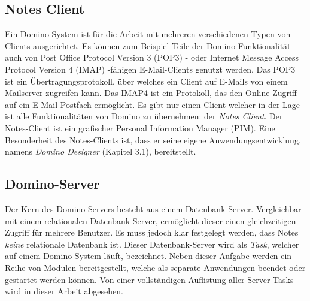 
\subsection{Notes Client}
\label{sec:2allgemein}


Ein Domino-System ist für die Arbeit mit mehreren verschiedenen Typen von Clients ausgerichtet. Es k\"onnen zum Beispiel Teile der Domino Funktionalit\"at 
auch von Post Office \linebreak Protocol Version 3 (POP3) - oder Internet Message Access Protocol Version 4 (IMAP) -\linebreak  f\"ahigen E-Mail-Clients  
genutzt  werden. 
Das POP3 ist ein Übertragungsprotokoll, über welches ein Client auf
E-Mails von einem Mailserver zugreifen kann\cite{pop}. Das IMAP4 ist ein Protokoll, das den Online-Zugriff auf ein 
E-Mail-Postfach ermöglicht\cite{imap}.\newline 
Es gibt nur einen Client welcher in der Lage ist alle Funktionalit\"aten von Domino zu \"ubernehmen: der \textit{Notes Client}.
Der Notes-Client ist ein grafischer Personal Information Manager (PIM).
Eine Besonderheit des Notes-Clients ist, dass er seine eigene Anwendungsentwicklung, namens \textit{Domino Designer} 
(Kapitel 3.1), bereitstellt\cite{knaepper}.


\subsection{Domino-Server}
\label{sec:2allgemein}

Der Kern des Domino-Servers besteht aus einem Datenbank-Server. Vergleichbar mit einem relationalen Datenbank-Server, ermöglicht dieser 
einen gleichzeitigen Zugriff für mehrere Benutzer. Es muss jedoch klar festgelegt werden, dass Notes \textit{keine} relationale Datenbank ist. 
Dieser Datenbank-Server wird als \textit{Task}, welcher auf einem Domino-System läuft, bezeichnet.
Neben dieser Aufgabe werden ein Reihe von Modulen bereitgestellt, welche als separate Anwendungen beendet oder gestartet werden können\cite{knaepper}.
Von einer vollständigen Auflistung aller Server-Tasks wird in dieser Arbeit abgesehen.
\vspace{0.5cm} 



